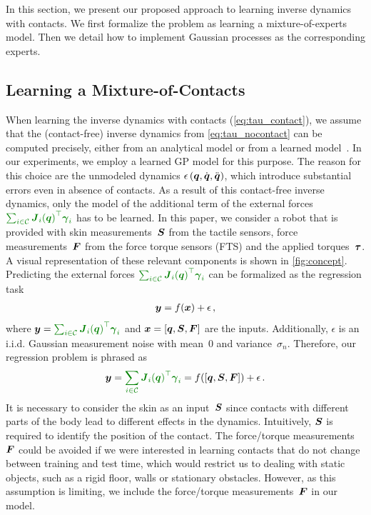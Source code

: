 

In this section, we present our proposed approach to learning inverse dynamics with contacts.
We first formalize the problem as learning a mixture-of-experts model.
Then we detail how to implement Gaussian processes as the corresponding experts.



\subsection{Learning a Mixture-of-Contacts}



	When learning the inverse dynamics with contacts (\eq\eqref{eq:tau_contact}), we assume that the (contact-free) inverse dynamics from \eq\eqref{eq:tau_nocontact} can be computed precisely, either from an analytical model or from a learned model~\cite{Nguyen-Tuong2011}.
    In our experiments, we employ a learned GP model for this purpose.
    The reason for this choice are the unmodeled dynamics $\epsilon\,(\boldsymbol q,\dot{\boldsymbol q},\ddot{\boldsymbol q})$, which introduce substantial errors even in absence of contacts.
	As a result of this contact-free inverse dynamics, only the model of the additional term of the external forces $\color{darkgreen}{\sum_{i \in\mathcal{C}} {\jacobian_i(\q)}\T \extForces_i}$ has to be learned.
    In this paper, we consider a robot that is provided with skin measurements~$\mathcal{\boldsymbol{S}}$ from the tactile sensors, force measurements~$\boldsymbol{F}$ from the force torque sensors (FTS) and the applied torques~$\boldsymbol{\tau}$.
    A visual representation of these relevant components is shown in \fig\ref{fig:concept}.
	Predicting the external forces $\color{darkgreen}{\sum_{i \in\mathcal{C}} {\jacobian_i(\q)}\T \extForces_i}$ can be formalized as the regression task
	\begin{align}
		\boldsymbol y = f(\boldsymbol x) + \epsilon\,,
		\label{eq:generic_regression_noise}
	\end{align}
	where $\outputMatrix = \textcolor{darkgreen}{\sum_{i \in\mathcal{C}} {\jacobian_i(\q)}\T \extForces_i}$ and  $\boldsymbol x = [\boldsymbol q, \mathcal{\boldsymbol{S}},\boldsymbol{F}]$ are the inputs. 
	Additionally, $\epsilon$ is an i.i.d. Gaussian measurement noise with mean~$0$ and variance~$\sigma_n$.
	Therefore, our regression problem is phrased as
	\begin{align}
		\outputMatrix =\textcolor{darkgreen}{\sum_{i \in\mathcal{C}} {\jacobian_i(\q)}\T \extForces_i}  = \regressionNo([\q, \skinInput,\ftsForces]) + \epsilon\,.
		\label{eq:regression}
	\end{align}
	It is necessary to consider the skin as an input~$\mathcal{\boldsymbol{S}}$ since contacts with different parts of the body lead to different effects in the dynamics.
	Intuitively, $\mathcal{\boldsymbol{S}}$ is required to identify the position of the contact.
	The force/torque measurements~$\boldsymbol{F}$ could be avoided if we were interested in learning contacts that do not change between training and test time, which would restrict us to dealing with static objects, such as a rigid floor, walls or stationary obstacles.
	However, as this assumption is limiting, we include the force/torque measurements~$\boldsymbol{F}$ in our model.


